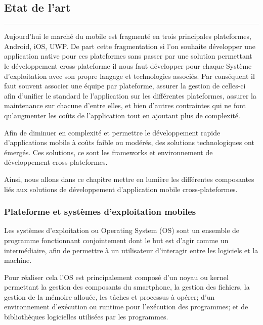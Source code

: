 \documentclass[11]{article}
\begin{document}
\newpage

\begin{center}
\part{Etat de l’art}
\noindent\rule{12cm}{0.4pt}
\end{center}

\setcounter{section}{0}

Aujourd’hui le marché du mobile est fragmenté en trois principales plateformes, Android, iOS, UWP. De part cette fragmentation si l’on souhaite développer une application native pour ces plateformes sans passer par une solution permettant le développement cross-plateforme il nous faut développer pour chaque Système d’exploitation avec son propre langage et technologies associés. Par conséquent il faut souvent associer une équipe par plateforme, assurer la gestion de celles-ci afin d’unifier le standard le l’application sur les différentes plateformes, assurer la maintenance sur chacune d’entre elles, et bien d’autres contraintes qui ne font qu’augmenter les coûts de l’application tout en ajoutant plus de complexité.

\vspace{0.5cm}

Afin de diminuer en complexité et permettre le développement rapide d’applications mobile à coûts faible ou modérés, des solutions technologiques ont émergés. Ces solutions, ce sont les frameworks et environnement de développement cross-plateformes.

\vspace{0.5cm}

Ainsi, nous allons dans ce chapitre mettre en lumière les différentes composantes liés aux solutions de développement d’application mobile cross-plateformes.


\section{Plateforme et systèmes d’exploitation mobiles}

Les systèmes d’exploitation ou Operating System (OS) sont un ensemble de programme fonctionnant conjointement dont le but est d’agir comme un intermédiaire, afin de permettre à un utilisateur d’interagir entre les logiciels et la machine.

\vspace{0.5cm}

Pour réaliser cela l’OS est principalement composé d’un noyau ou kernel permettant la gestion des composants du smartphone, la gestion des fichiers, la gestion de la mémoire allouée, les tâches et processus à opérer; d’un environnement d'exécution ou runtime pour l'exécution des programmes; et de bibliothèques logicielles utilisées par les programmes.
\end{document}
